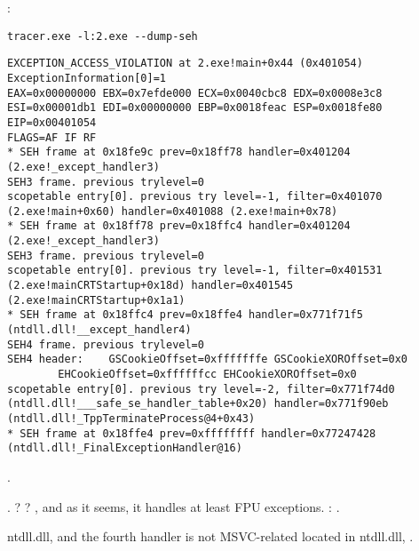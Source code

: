  \tracer{}:

\begin{lstlisting}
tracer.exe -l:2.exe --dump-seh
\end{lstlisting}

\begin{lstlisting}[caption=tracer.exe output]
EXCEPTION_ACCESS_VIOLATION at 2.exe!main+0x44 (0x401054) ExceptionInformation[0]=1
EAX=0x00000000 EBX=0x7efde000 ECX=0x0040cbc8 EDX=0x0008e3c8
ESI=0x00001db1 EDI=0x00000000 EBP=0x0018feac ESP=0x0018fe80
EIP=0x00401054
FLAGS=AF IF RF
* SEH frame at 0x18fe9c prev=0x18ff78 handler=0x401204 (2.exe!_except_handler3)
SEH3 frame. previous trylevel=0
scopetable entry[0]. previous try level=-1, filter=0x401070 (2.exe!main+0x60) handler=0x401088 (2.exe!main+0x78)
* SEH frame at 0x18ff78 prev=0x18ffc4 handler=0x401204 (2.exe!_except_handler3)
SEH3 frame. previous trylevel=0
scopetable entry[0]. previous try level=-1, filter=0x401531 (2.exe!mainCRTStartup+0x18d) handler=0x401545 (2.exe!mainCRTStartup+0x1a1)
* SEH frame at 0x18ffc4 prev=0x18ffe4 handler=0x771f71f5 (ntdll.dll!__except_handler4)
SEH4 frame. previous trylevel=0
SEH4 header:	GSCookieOffset=0xfffffffe GSCookieXOROffset=0x0
		EHCookieOffset=0xffffffcc EHCookieXOROffset=0x0
scopetable entry[0]. previous try level=-2, filter=0x771f74d0 (ntdll.dll!___safe_se_handler_table+0x20) handler=0x771f90eb (ntdll.dll!_TppTerminateProcess@4+0x43)
* SEH frame at 0x18ffe4 prev=0xffffffff handler=0x77247428 (ntdll.dll!_FinalExceptionHandler@16)
\end{lstlisting}

. 

. ?
?
, 
{and as it seems, it handles at least \ac{FPU} exceptions}.
: .

 ntdll.dll, 
{and the fourth handler is not MSVC-related located in} ntdll.dll,
.


